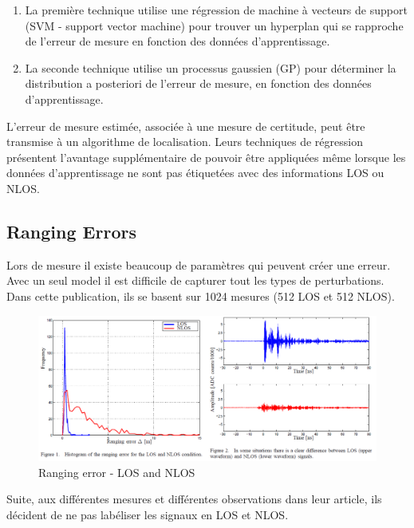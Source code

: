 \begin{enumerate}
	\item La première technique utilise une régression de machine à vecteurs de support (SVM - support vector machine) pour trouver un hyperplan qui se rapproche de l'erreur de mesure en fonction des données d'apprentissage. 
	\item La seconde technique utilise un processus gaussien (GP) pour déterminer la distribution a posteriori de l'erreur de mesure, en fonction des données d'apprentissage. 
\end{enumerate}

L'erreur de mesure estimée, associée à une mesure de certitude, peut être transmise à un algorithme de localisation. Leurs techniques de régression présentent l'avantage supplémentaire de pouvoir être appliquées même lorsque les données d'apprentissage ne sont pas étiquetées avec des informations LOS ou NLOS.

\subsection{Ranging Errors}
Lors de mesure il existe beaucoup de paramètres qui peuvent créer une erreur. Avec un seul model il est difficile de capturer tout les types de perturbations. Dans cette publication, ils se basent sur 1024 mesures (512 LOS et 512 NLOS).

\begin{figure}[H]
	\begin{center}
		\includegraphics[scale=0.6]{figures/LosNlos.png}
		\caption{Ranging error - LOS and NLOS}
		\label{fig:LosNlos} %
	\end{center}
\end{figure}

Suite, aux différentes mesures et différentes observations dans leur article, ils décident de ne pas labéliser les signaux en LOS et NLOS.

